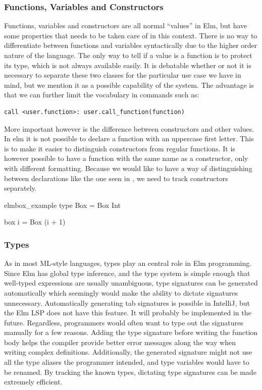 \documentclass[../thesis.tex]{subfiles}
\begin{document}
\subsubsection{Functions, Variables and Constructors}%
\label{par:functions_and_variables}
Functions, variables and constructors are all normal ``values'' in Elm, but have some properties
that needs to be taken care of in this context.
There is no way to differentiate between functions and variables syntactically due to the higher order nature of the language.
The only way to tell if a value is a function is to protect its type, which is not always available easily.
It is debatable whether or not it is necessary to separate these two classes for the particular use case we have in mind,
but we mention it as a possible capability of the system.
The advantage is that we can further limit the vocabulary in commands such as:
\begin{verbatim}
call <user.function>: user.call_function(function)
\end{verbatim}
More important however is the difference between constructors and other values.
In elm it is not possible to declare a function with an uppercase first letter.
This is to make it easier to distinguish constructors from regular functions.
It is however possible to have a function with the same name as a constructor, only with different formatting.
Because we would like to have a way of distinguishing between declarations like the one seen in ,
we need to track constructors separately.
\begin{code}{elm}{}{box_example}
type Box = Box Int

box i = Box (i + 1) 
\end{code}

\subsubsection{Types}%
\label{par:types}
As in most ML-style languages, types play an central role in Elm programming.
Since Elm has global type inference, and the type system is simple enough that
well-typed expressions are usually unambiguous, type signatures can be generated
automatically which seemingly would make the ability to dictate signatures unnecessary.
Automatically generating tab signatures is possible in IntelliJ, but the Elm LSP does not have this feature. 
It will probably be implemented in the future.
Regardless, programmers would often want to type out the signatures manually for a few reasons.
Adding the type signature before writing the function body helps the compiler provide better
error messages along the way when writing complex definitions.
Additionally, the generated signature might not use all the type aliases the programmer intended, and
type variables would have to be renamed.
By tracking the known types, dictating type signatures can be made extremely efficient.
\end{document}
